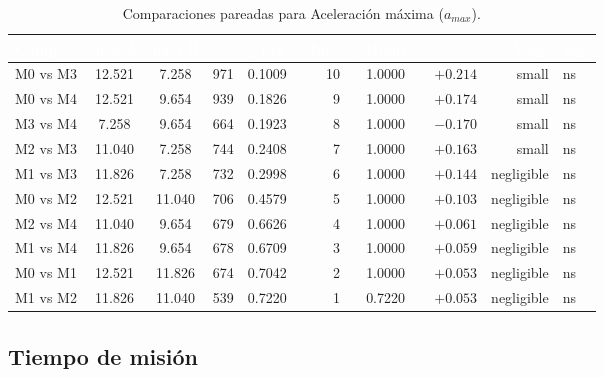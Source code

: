 \documentclass[12pt,a4paper,oneside]{book}
\begin{document}
\begin{table}[H]
\centering
\small
\caption{Comparaciones pareadas para Aceleración máxima ($a_{max}$).}
\renewcommand{\arraystretch}{1.15}
\begin{tabular}{lcccrrrrrl}
\toprule
\rowcolor{primary}
\textcolor{white}{\textbf{Comp.}} & \textcolor{white}{\textbf{med A}} & \textcolor{white}{\textbf{med B}} & \textcolor{white}{\textbf{$U$}} & \textcolor{white}{\textbf{$p$ raw}} & \textcolor{white}{\textbf{Mult.}} & \textcolor{white}{\textbf{$p$ Holm}} & \textcolor{white}{\textbf{$\delta(A,B)$}} & \textcolor{white}{\textbf{Mag.}} & \textcolor{white}{\textbf{Sig.}} \\
\midrule
M0 vs M3 & 12.521 & 7.258 & 971 & 0.1009 & 10 & 1.0000 & $+0.214$ & small & ns \\
M0 vs M4 & 12.521 & 9.654 & 939 & 0.1826 & 9 & 1.0000 & $+0.174$ & small & ns \\
M3 vs M4 & 7.258 & 9.654 & 664 & 0.1923 & 8 & 1.0000 & $-0.170$ & small & ns \\
M2 vs M3 & 11.040 & 7.258 & 744 & 0.2408 & 7 & 1.0000 & $+0.163$ & small & ns \\
M1 vs M3 & 11.826 & 7.258 & 732 & 0.2998 & 6 & 1.0000 & $+0.144$ & negligible & ns \\
M0 vs M2 & 12.521 & 11.040 & 706 & 0.4579 & 5 & 1.0000 & $+0.103$ & negligible & ns \\
M2 vs M4 & 11.040 & 9.654 & 679 & 0.6626 & 4 & 1.0000 & $+0.061$ & negligible & ns \\
M1 vs M4 & 11.826 & 9.654 & 678 & 0.6709 & 3 & 1.0000 & $+0.059$ & negligible & ns \\
M0 vs M1 & 12.521 & 11.826 & 674 & 0.7042 & 2 & 1.0000 & $+0.053$ & negligible & ns \\
M1 vs M2 & 11.826 & 11.040 & 539 & 0.7220 & 1 & 0.7220 & $+0.053$ & negligible & ns \\
\bottomrule
\end{tabular}
\end{table}

\subsection{Tiempo de misión}
\end{document}
